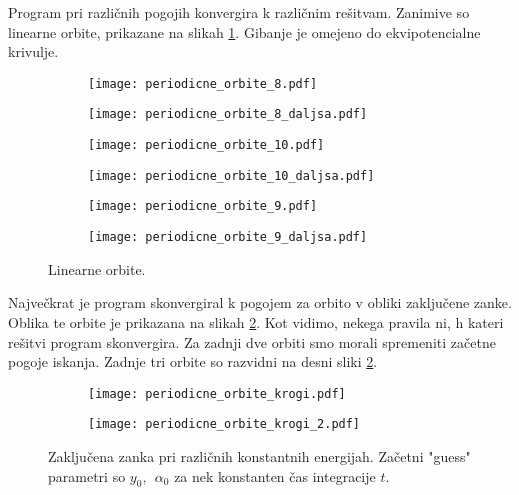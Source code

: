 \documentclass[12pt,a4paper]{article}
\begin{document}
Program pri različnih pogojih konvergira k različnim rešitvam. Zanimive so linearne orbite, prikazane na slikah \ref{fig:slika9}. Gibanje je omejeno do ekvipotencialne krivulje.
\begin{figure}[H]
    \centering
    \begin{subfigure}[b]{0.45\textwidth}  			
        \texttt{[image: periodicne\_orbite\_8.pdf]}
    \end{subfigure}
    \begin{subfigure}[b]{0.45\textwidth}  			
        \texttt{[image: periodicne\_orbite\_8\_daljsa.pdf]}
    \end{subfigure}
   
        \begin{subfigure}[b]{0.45\textwidth}  			
        \texttt{[image: periodicne\_orbite\_10.pdf]}
    \end{subfigure}
    \begin{subfigure}[b]{0.45\textwidth}  			
        \texttt{[image: periodicne\_orbite\_10\_daljsa.pdf]}
    \end{subfigure}
    
    \begin{subfigure}[b]{0.45\textwidth}  			
        \texttt{[image: periodicne\_orbite\_9.pdf]}
    \end{subfigure}
    \begin{subfigure}[b]{0.45\textwidth}  			
        \texttt{[image: periodicne\_orbite\_9\_daljsa.pdf]}
    \end{subfigure}
    \caption{Linearne orbite.} 
    \label{fig:slika9}
\end{figure}
\noindent Največkrat je program skonvergiral k pogojem za orbito v obliki zaključene zanke. Oblika te orbite je prikazana na slikah \ref{fig:slika10}. Kot vidimo, nekega pravila ni, h kateri rešitvi program skonvergira. Za zadnji dve orbiti smo morali spremeniti začetne pogoje iskanja. Zadnje tri orbite so razvidni na desni sliki \ref{fig:slika10}.

\begin{figure}[H]
    \centering
    \begin{subfigure}[b]{0.45\textwidth}  			
        \texttt{[image: periodicne\_orbite\_krogi.pdf]}
    \end{subfigure}
    \begin{subfigure}[b]{0.45\textwidth}  			
        \texttt{[image: periodicne\_orbite\_krogi\_2.pdf]}
    \end{subfigure}
    \caption{Zaključena zanka pri različnih konstantnih energijah. Začetni "guess" parametri so $y_0, \ \ \alpha_0$ za nek konstanten čas integracije $t$.} 
    \label{fig:slika10}
\end{figure}
\end{document}
